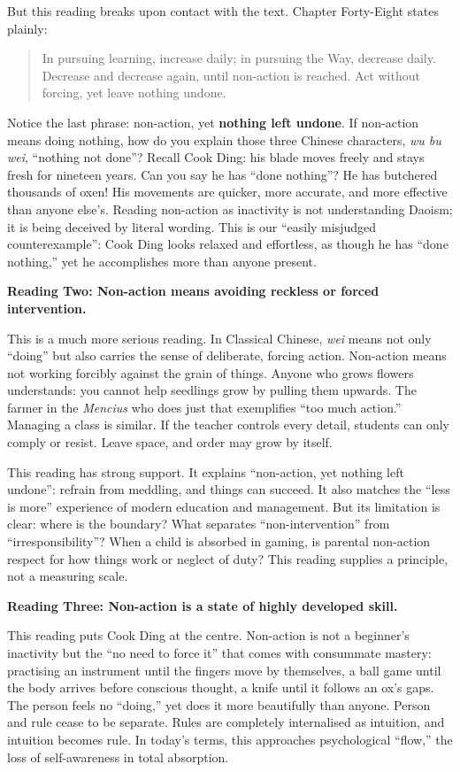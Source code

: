 But this reading breaks upon contact with the text. Chapter Forty-Eight states plainly:

\begin{quote}
In pursuing learning, increase daily; in pursuing the Way, decrease daily. Decrease and decrease again, until non-action is reached. Act without forcing, yet leave nothing undone.
\end{quote}
Notice the last phrase: non-action, yet \textbf{nothing left undone}. If non-action means doing nothing, how do you explain those three Chinese characters, \textit{wu bu wei}, ``nothing not done''? Recall Cook Ding: his blade moves freely and stays fresh for nineteen years. Can you say he has ``done nothing''? He has butchered thousands of oxen! His movements are quicker, more accurate, and more effective than anyone else's. Reading non-action as inactivity is not understanding Daoism; it is being deceived by literal wording. This is our ``easily misjudged counterexample'': Cook Ding looks relaxed and effortless, as though he has ``done nothing,'' yet he accomplishes more than anyone present.

\textbf{Reading Two: Non-action means avoiding reckless or forced intervention.}

This is a much more serious reading. In Classical Chinese, \textit{wei} means not only ``doing'' but also carries the sense of deliberate, forcing action. Non-action means not working forcibly against the grain of things. Anyone who grows flowers understands: you cannot help seedlings grow by pulling them upwards. The farmer in the \textit{Mencius} who does just that exemplifies ``too much action.'' Managing a class is similar. If the teacher controls every detail, students can only comply or resist. Leave space, and order may grow by itself.

This reading has strong support. It explains ``non-action, yet nothing left undone'': refrain from meddling, and things can succeed. It also matches the ``less is more'' experience of modern education and management. But its limitation is clear: where is the boundary? What separates ``non-intervention'' from ``irresponsibility''? When a child is absorbed in gaming, is parental non-action respect for how things work or neglect of duty? This reading supplies a principle, not a measuring scale.

\textbf{Reading Three: Non-action is a state of highly developed skill.}

This reading puts Cook Ding at the centre. Non-action is not a beginner's inactivity but the ``no need to force it'' that comes with consummate mastery: practising an instrument until the fingers move by themselves, a ball game until the body arrives before conscious thought, a knife until it follows an ox's gaps. The person feels no ``doing,'' yet does it more beautifully than anyone. Person and rule cease to be separate. Rules are completely internalised as intuition, and intuition becomes rule. In today's terms, this approaches psychological ``flow,'' the loss of self-awareness in total absorption.

